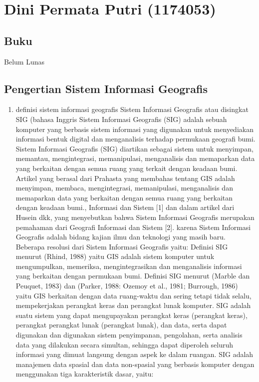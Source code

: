 \section{Dini Permata Putri (1174053)}
\subsection{Buku}
Belum Lunas 
\subsection{Pengertian Sistem Informasi Geografis}
\begin{enumerate}
\item definisi sistem informasi geografis 
Sistem Informasi Geografis atau disingkat SIG (bahasa Inggris Sistem Informasi Geografis (SIG) adalah sebuah komputer yang berbasis sistem informasi yang digunakan untuk menyediakan informasi bentuk digital dan menganalisis terhadap permukaan geografi bumi. Sistem Informasi Geografis (SIG) diartikan sebagai sistem untuk menyimpan, memantau, mengintegrasi, memanipulasi, menganalisis dan memaparkan data yang berkaitan dengan semua ruang yang terkait dengan keadaan bumi. Artikel yang berasal dari Prahasta yang membahas tentang GIS adalah menyimpan, membaca, mengintegrasi, memanipulasi, menganalisis dan memaparkan data yang berkaitan dengan semua ruang yang berkaitan dengan keadaan bumi., Informasi dan Sistem 
[1] dan dalam artikel dari Husein dkk, yang menyebutkan bahwa Sistem Informasi Geografis merupakan pemahaman dari Geografi Informasi dan Sistem [2].
karena Sistem Informasi Geografis adalah bidang kajian ilmu dan teknologi yang masih baru. Beberapa resolusi dari Sistem Informasi Geografis yaitu:
Definisi SIG menurut (Rhind, 1988) yaitu GIS adalah sistem komputer untuk mengumpulkan, memeriksa, mengintegrasikan dan menganalisis informasi yang berkaitan dengan permukaan bumi. 
Definisi SIG menurut (Marble dan Peuquet, 1983) dan (Parker, 1988: Ozemoy et al., 1981; Burrough, 1986) yaitu GIS berkaitan dengan data ruang-waktu dan sering tetapi tidak selalu, mempekerjakan perangkat keras dan perangkat lunak komputer.
SIG adalah suatu sistem yang dapat mengupayakan perangkat keras (perangkat keras), perangkat perangkat lunak (perangkat lunak), dan data, serta dapat digunakan dan digunakan sistem penyimpanan, pengolahan, serta analisis data yang dilakukan secara simultan, sehingga dapat diperoleh seluruh informasi yang dimuat langsung dengan aspek ke dalam ruangan.  SIG adalah manajemen data spasial dan data non-spasial yang berbasis komputer dengan menggunakan tiga karakteristik dasar, yaitu: 
\end{enumerate}
